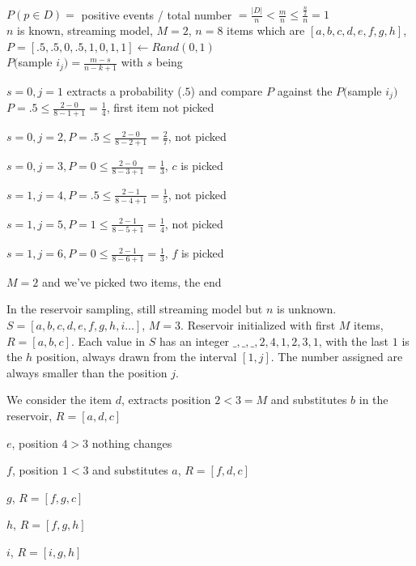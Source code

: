 \documentclass[10pt]{report}
\begin{document}
\paragraph{} %
$P(p\in D) = $ positive events / total number $= \frac{|D|}{n} < \frac{m}{n} \leq \frac{\frac{n}{2}}{n} = 1$\\

$n$ is known, streaming model, $M = 2$, $n = 8$ items which are $[a, b, c, d, e, f, g, h]$, $P = [.5, .5, 0, .5, 1, 0, 1, 1] \leftarrow Rand(0,1)$\\
$P($sample $i_j) = \frac{m - s}{n - k + 1}$ with $s$ being\\ %
\begin{list}{}{}
	\item $s = 0, j = 1$ extracts a probability ($.5$) and compare $P$ against the $P($sample $i_j)$\\
	$P = .5 \leq \frac{2 - 0}{8 - 1 + 1} = \frac{1}{4}$, first item not picked
	\item $s = 0, j = 2, P = .5 \leq \frac{2 - 0}{8 - 2 + 1} = \frac{2}{7}$, not picked
	\item $s = 0, j = 3, P = 0 \leq \frac{2 - 0}{8 - 3 + 1} = \frac{1}{3}$, $c$ is picked
	\item $s = 1, j = 4, P = .5 \leq \frac{2 - 1}{8 - 4 + 1} = \frac{1}{5}$, not picked
	\item $s = 1, j = 5, P = 1 \leq \frac{2 - 1}{8 - 5 + 1} = \frac{1}{4}$, not picked
	\item $s = 1, j = 6, P = 0 \leq \frac{2 - 1}{8 - 6 + 1} = \frac{1}{3}$, $f$ is picked
	\item $M = 2$ and we've picked two items, the end
\end{list}
In the reservoir sampling, still streaming model but $n$ is unknown. $S = [a, b, c, d, e, f, g, h, i\ldots]$, $M = 3$. Reservoir initialized with first $M$ items, $R = [a, b, c]$. Each value in $S$ has an integer $\_, \_, \_, 2, 4, 1, 2, 3, 1$, with the last $1$ is the $h$ position, always drawn from the interval $[1, j]$. The number assigned are always smaller than the position $j$.
\begin{list}{}{}
	\item We consider the item $d$, extracts position $2 < 3 = M$ and substitutes $b$ in the reservoir, $R = [a, d, c]$
	\item $e$, position $4 > 3$ nothing changes
	\item $f$, position $1 < 3$ and substitutes $a$, $R =  [f, d, c]$
	\item $g$, $R = [f, g, c]$
	\item $h$, $R = [f, g, h]$
	\item $i$, $R = [i, g, h]$
\end{list}
\end{document}
